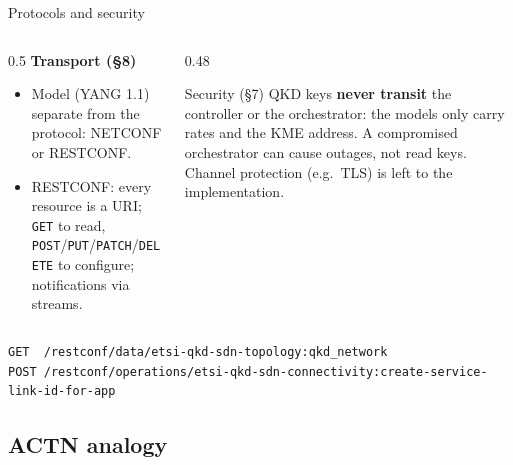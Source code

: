 \documentclass[10pt]{beamer}
\begin{document}
\begin{frame}[fragile]{Protocols and security}
  \begin{columns}[T]
    \begin{column}{0.5\textwidth}
      \textbf{Transport (§8)}
      \begin{itemize}\small
        \item Model (YANG 1.1) separate from the protocol: NETCONF or
              RESTCONF.
        \item RESTCONF: every resource is a URI; \texttt{GET} to read,
              \texttt{POST}/\texttt{PUT}/\texttt{PATCH}/\texttt{DELETE}
              to configure; notifications via streams.
      \end{itemize}
    \end{column}
    \begin{column}{0.48\textwidth}
      \begin{alertblock}{Security (§7)}
        \small QKD keys \textbf{never transit} the controller or the
        orchestrator: the models only carry rates and the KME address. A
        compromised orchestrator can cause outages, not read keys. Channel
        protection (e.g.\ TLS) is left to the implementation.
      \end{alertblock}
    \end{column}
  \end{columns}
  \vspace{1ex}
\begin{lstlisting}
GET  /restconf/data/etsi-qkd-sdn-topology:qkd_network
POST /restconf/operations/etsi-qkd-sdn-connectivity:create-service-link-id-for-app
\end{lstlisting}
\end{frame}

\subsection{ACTN analogy}
\end{document}
